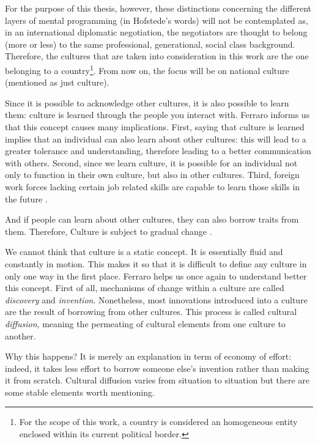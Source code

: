 \documentclass[../main.tex]{subfiles}
\begin{document}
For the purpose of this thesis, however, these distinctions concerning the different layers of mental programming (in Hofstede's words) will not be contemplated as, in an international diplomatic negotiation, the negotiators are thought to belong (more or less) to the same professional, generational, social class background. Therefore, the cultures that are taken into consideration in this work are the one belonging to a country\footnote{For the scope of this work, a country is considered an homogeneous entity enclosed within its current political border.}. From now on, the focus will be on national culture (mentioned as just culture).

Since it is possible to acknowledge other cultures, it is also possible to learn them: culture is learned through the people you interact with. Ferraro informs us that this concept causes many implications. First, saying that culture is learned implies that an individual can also learn about other cultures: this will lead to a greater tolerance and understanding, therefore leading to a better communication with others. Second, since we learn culture, it is possible for an individual not only to function in their own culture, but also in other cultures. Third, foreign work forces lacking certain job related skills are capable to learn those skills in the future \autocite[19]{ferraro}.

And if people can learn about other cultures, they can also borrow traits from them. Therefore, Culture is subject to gradual change \autocite[12]{helen}.

We cannot think that culture is a static concept.
It is essentially fluid and constantly in motion. This makes it so that it is difficult to define any culture in only one way in the first place. Ferraro \autocite*[25-29]{ferraro} helps us once again to understand better this concept. First of all, mechanisms of change within a culture are called \textit{discovery} and \textit{invention}. Nonetheless, most innovations introduced into a culture are the result of borrowing from other cultures. This process is called cultural \textit{diffusion}, meaning the permeating of cultural elements from one culture to another.

Why this happens? It is merely an explanation in term of economy of effort: indeed, it takes less effort to borrow someone else's invention rather than making it from scratch. Cultural diffusion varies from situation to situation but there are some stable elements worth mentioning.
\end{document}
